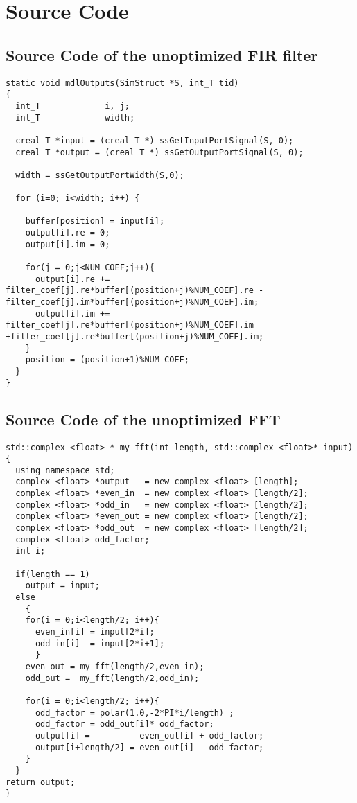 \chapter{Source Code}

\section{Source Code of the unoptimized FIR filter}
\label{sec:app_FIR}


\begin{lstlisting}[columns=flexible]
static void mdlOutputs(SimStruct *S, int_T tid)
{
  int_T             i, j;
  int_T             width;
        
  creal_T *input = (creal_T *) ssGetInputPortSignal(S, 0);
  creal_T *output = (creal_T *) ssGetOutputPortSignal(S, 0);

  width = ssGetOutputPortWidth(S,0);
       
  for (i=0; i<width; i++) {
        
    buffer[position] = input[i];
    output[i].re = 0;
    output[i].im = 0;

    for(j = 0;j<NUM_COEF;j++){
      output[i].re +=		filter_coef[j].re*buffer[(position+j)%NUM_COEF].re -filter_coef[j].im*buffer[(position+j)%NUM_COEF].im;
      output[i].im += 	filter_coef[j].re*buffer[(position+j)%NUM_COEF].im +filter_coef[j].re*buffer[(position+j)%NUM_COEF].im;
    }
    position = (position+1)%NUM_COEF;
  }   
}

\end{lstlisting}


\section{Source Code of the unoptimized FFT}
\label{sec:app_03}



\begin{lstlisting}[columns=flexible]
std::complex <float> * my_fft(int length, std::complex <float>* input)
{
  using namespace std;
  complex <float> *output   = new complex <float> [length];
  complex <float> *even_in  = new complex <float> [length/2];
  complex <float> *odd_in   = new complex <float> [length/2];
  complex <float> *even_out = new complex <float> [length/2];
  complex <float> *odd_out  = new complex <float> [length/2];
  complex <float> odd_factor;
  int i;

  if(length == 1)
    output = input;
  else
    {
    for(i = 0;i<length/2; i++){
      even_in[i] = input[2*i];
      odd_in[i]  = input[2*i+1];
      }
    even_out = my_fft(length/2,even_in);
    odd_out =  my_fft(length/2,odd_in);
		    
    for(i = 0;i<length/2; i++){
      odd_factor = polar(1.0,-2*PI*i/length) ;
      odd_factor = odd_out[i]* odd_factor;
      output[i] =          even_out[i] + odd_factor;
      output[i+length/2] = even_out[i] - odd_factor;
    }
  }
return output;
}

\end{lstlisting}


